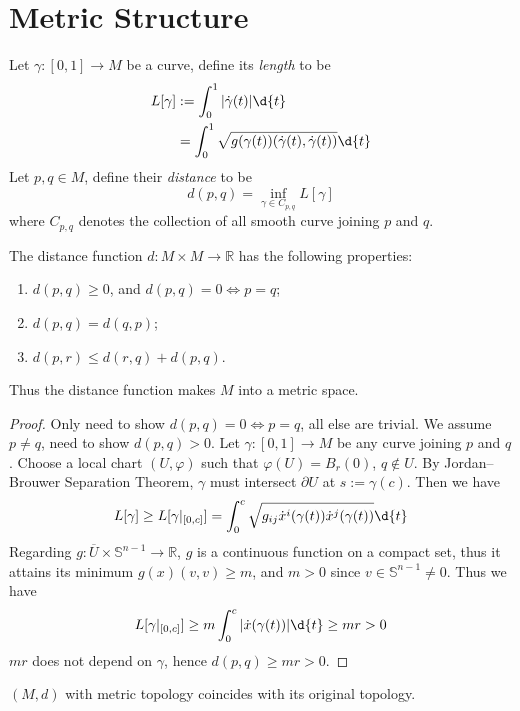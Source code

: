 \section{Metric Structure}

\begin{defn}
    Let $\gamma:[0,1]\to M$ be a curve, define its \emph{length} to be
    \begin{align*}
        L[\gamma]&:=\int_0^1|\dot{\gamma}(t)|\d{t}\\
        &=\int_0^1\sqrt{g(\gamma(t))(\dot{\gamma}(t),\dot{\gamma}(t))}\d{t}
    \end{align*}
    Let $p,q\in M$, define their \emph{distance} to be
    \[d(p,q)=\inf_{\gamma\in C_{p,q}}L[\gamma]\]
    where $C_{p,q}$ denotes the collection of all smooth curve joining $p$ and $q$.
\end{defn}

\begin{prop}
    The distance function $d:M\times M\to\mathbb{R}$ has the following properties:
    \begin{enumerate}[(1)]
        \item $d(p,q)\geq 0$, and $d(p,q)=0\iff p=q$;
        \item $d(p,q)=d(q,p)$;
        \item $d(p,r)\leq d(r,q)+d(p,q)$.
    \end{enumerate}
    Thus the distance function makes $M$ into a metric space.
\end{prop}
\begin{proof}
    Only need to show $d(p,q)=0\iff p=q$, all else are trivial.
    We assume $p\neq q$, need to show $d(p,q)>0$.
    Let $\gamma:[0,1]\to M$ be any curve joining $p$ and $q$.
    Choose a local chart $(U,\varphi)$ such that $\varphi(U)=B_r(0)$, $q\notin U$.
    By Jordan--Brouwer Separation Theorem, $\gamma$ must intersect $\partial{U}$ at $s:=\gamma(c)$.
    Then we have
    \[L[\gamma]\geq L[\gamma|_{[0,c]}]=\int_0^c\sqrt{g_{ij}\dot{x}^i(\gamma(t))\dot{x}^j(\gamma(t))}\d{t}\]
    Regarding $g:\overline{U}\times\mathbb{S}^{n-1}\to\mathbb{R}$, $g$ is a continuous function on a compact set, thus it attains its minimum $g(x)(v,v)\geq m$, and $m>0$ since $v\in\mathbb{S}^{n-1}\neq 0$.
    Thus we have
    \[L[\gamma|_{[0,c]}]\geq m\int_0^c|\dot{x}(\gamma(t))|\d{t}\geq mr>0\]
    $mr$ does not depend on $\gamma$, hence $d(p,q)\geq mr>0$.
\end{proof}

\begin{prop}
    $(M,d)$ with metric topology coincides with its original topology.
\end{prop}

